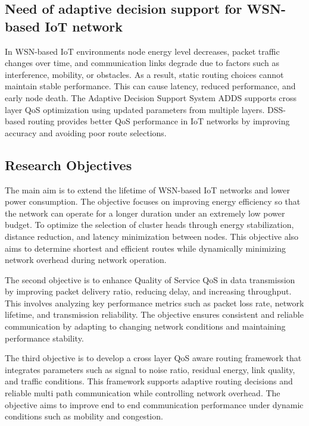\documentclass[a4paper,fleqn]{cas-dc}
\numberwithin{equation}{section}
\begin{document}
\subsection{Need of adaptive decision support for WSN-based IoT network}
 
In WSN-based IoT environments node energy level decreases,  packet traffic changes over time, and communication links degrade due to factors such as interference, mobility, or obstacles. As a result, static routing choices cannot maintain stable performance. This can cause latency, reduced performance, and early node death. The Adaptive Decision Support System ADDS supports cross layer QoS optimization using updated parameters from multiple layers. DSS-based routing provides better QoS performance in IoT networks by improving accuracy and avoiding poor route selections.


\subsection{Research Objectives}

The main aim is to extend the lifetime of WSN-based IoT networks and lower power consumption. The objective focuses on improving energy efficiency so that the network can operate for a longer duration under an extremely low power budget. To optimize the selection of cluster heads through energy stabilization, distance reduction, and latency minimization between nodes. This objective also aims to determine shortest and efficient routes while dynamically minimizing network overhead during network operation.

The second objective is to enhance Quality of Service QoS in data transmission by improving packet delivery ratio, reducing delay, and increasing throughput. This involves analyzing key performance metrics such as packet loss rate, network lifetime, and transmission reliability. The objective ensures consistent and reliable communication by adapting to changing network conditions and maintaining performance stability.

The third objective is to develop a cross layer QoS aware routing framework that integrates parameters such as signal to noise ratio, residual energy, link quality, and traffic conditions. This framework supports adaptive routing decisions and reliable multi path communication while controlling network overhead. The objective aims to improve end to end communication performance under dynamic conditions such as mobility and congestion.
\end{document}
